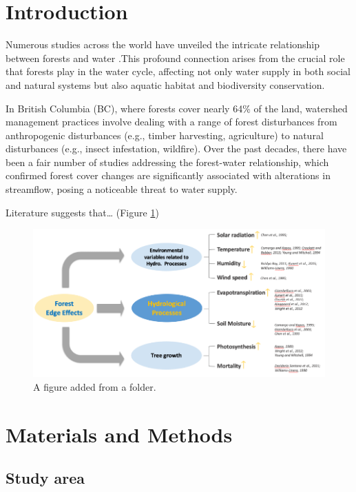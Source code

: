 \documentclass[Water,article,submit,oneauthor]{Definitions/mdpi}
\begin{document}

\hypertarget{introduction}{%
\section{Introduction}\label{introduction}}

Numerous studies across the world have unveiled the intricate
relationship between forests and water
\citep{bertrand-krajewski_distribution_1998, leutnant_stormwater_2016}.This
profound connection arises from the crucial role that forests play in
the water cycle, affecting not only water supply in both social and
natural systems but also aquatic habitat and biodiversity conservation.

In British Columbia (BC), where forests cover nearly 64\% of the land,
watershed management practices involve dealing with a range of forest
disturbances from anthropogenic disturbances (e.g., timber harvesting,
agriculture) to natural disturbances (e.g., insect infestation,
wildfire). Over the past decades, there have been a fair number of
studies addressing the forest-water relationship, which confirmed forest
cover changes are significantly associated with alterations in
streamflow, posing a noticeable threat to water supply.

Literature suggests that\ldots{} (Figure \ref{fig:fig1})

\begin{figure}
\includegraphics[width=0.7\linewidth]{../04_figs/literature_summary} \caption{A figure added from a folder.\label{fig:fig1}}\label{fig:fig1}
\end{figure}

\hypertarget{materials-and-methods}{%
\section{Materials and Methods}\label{materials-and-methods}}

\hypertarget{study-area}{%
\subsection{Study area}\label{study-area}}
\end{document}
